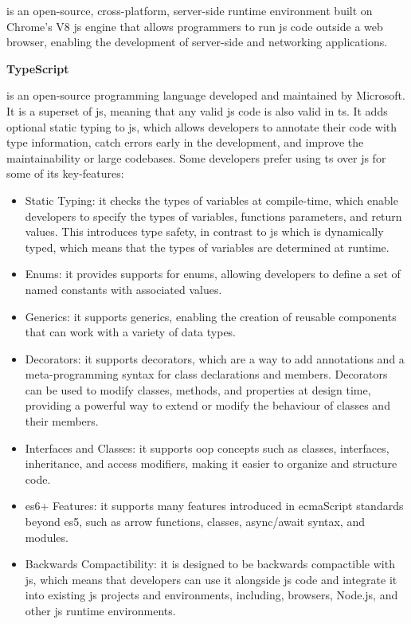 \begin{multicols}{2}
      is an open-source, cross-platform, server-side runtime environment built on Chrome's V8 \acrshort{js} engine that allows
      programmers to run \acrshort{js} code outside a web browser, enabling the development of server-side and networking applications.

      \textbf{TypeScript}

      is an open-source programming language developed and maintained by Microsoft. It is a superset of \acrshort{js}, meaning that any valid
      \acrshort{js} code is also valid in \acrshort{ts}. It adds optional static typing to \acrshort{js}, which allows developers to annotate
      their code with type information, catch errors early in the development, and improve the maintainability or large codebases. Some
      developers prefer using \acrshort{ts} over \acrshort{js} for some of its key-features:
      \begin{itemize}
            \item Static Typing: it checks the types of variables at compile-time, which enable developers to specify the types of variables,
                  functions parameters, and return values. This introduces type safety, in contrast to \acrshort{js} which is dynamically typed,
                  which means that the types of variables are determined at runtime.
            \item Enums: it provides supports for enums, allowing developers to define a set of named constants with associated values.
            \item Generics: it supports generics, enabling the creation of reusable components that can work with a variety of data types.
            \item Decorators: it supports decorators, which are a way to add annotations and a meta-programming syntax for class declarations
                  and  members. Decorators can be used to modify classes, methods, and properties at design time, providing a powerful way to
                  extend or modify the behaviour of classes and their members.
            \item Interfaces and Classes: it supports \acrshort{oop} concepts such as classes, interfaces, inheritance, and access modifiers,
                  making it easier to organize and structure code.
            \item \acrshort{es}6+ Features: it supports many features introduced in \acrshort{ecma}Script standards beyond \acrshort{es}5,
                  such as arrow functions, classes, async/await syntax, and modules.
            \item Backwards Compactibility: it is designed to be backwards compactible with \acrshort{js}, which means that developers can use
                  it alongside \acrshort{js} code and integrate it into existing \acrshort{js} projects and environments, including, browsers,
                  Node.js, and other \acrshort{js} runtime environments.
      \end{itemize}
\end{multicols}

